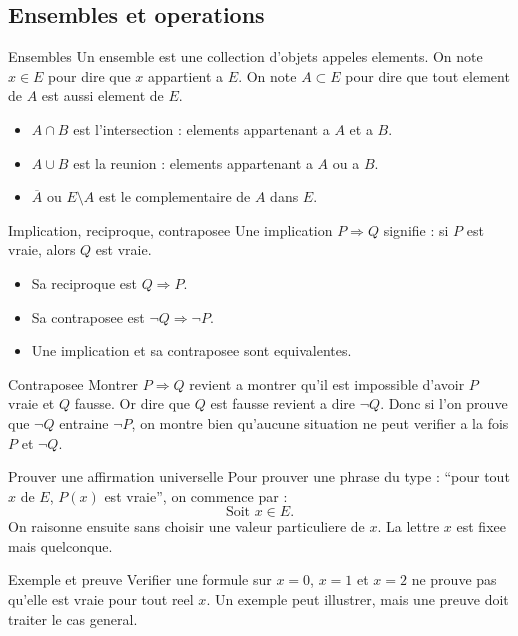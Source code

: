 \documentclass[11pt,a4paper]{article}
\begin{document}
\subsection{Ensembles et operations}
\begin{boitecours}{Ensembles}
Un ensemble est une collection d'objets appeles elements. On note $x\in E$ pour dire que $x$ appartient a $E$. On note $A\subset E$ pour dire que tout element de $A$ est aussi element de $E$.
\begin{itemize}
  \item $A\cap B$ est l'intersection : elements appartenant a $A$ et a $B$.
  \item $A\cup B$ est la reunion : elements appartenant a $A$ ou a $B$.
  \item $\overline A$ ou $E\setminus A$ est le complementaire de $A$ dans $E$.
\end{itemize}
\end{boitecours}

\begin{boitecours}{Implication, reciproque, contraposee}
Une implication $P\Rightarrow Q$ signifie : si $P$ est vraie, alors $Q$ est vraie.
\begin{itemize}
  \item Sa reciproque est $Q\Rightarrow P$.
  \item Sa contraposee est $\neg Q\Rightarrow \neg P$.
  \item Une implication et sa contraposee sont equivalentes.
\end{itemize}
\end{boitecours}

\begin{boitepreuve}{Contraposee}
Montrer $P\Rightarrow Q$ revient a montrer qu'il est impossible d'avoir $P$ vraie et $Q$ fausse. Or dire que $Q$ est fausse revient a dire $\neg Q$. Donc si l'on prouve que $\neg Q$ entraine $\neg P$, on montre bien qu'aucune situation ne peut verifier a la fois $P$ et $\neg Q$.
\end{boitepreuve}

\begin{boitemethode}{Prouver une affirmation universelle}
Pour prouver une phrase du type : ``pour tout $x$ de $E$, $P(x)$ est vraie'', on commence par :
\[
\text{Soit }x\in E.
\]
On raisonne ensuite sans choisir une valeur particuliere de $x$. La lettre $x$ est fixee mais quelconque.
\end{boitemethode}

\begin{boiteattention}{Exemple et preuve}
Verifier une formule sur $x=0$, $x=1$ et $x=2$ ne prouve pas qu'elle est vraie pour tout reel $x$. Un exemple peut illustrer, mais une preuve doit traiter le cas general.
\end{boiteattention}
\end{document}
